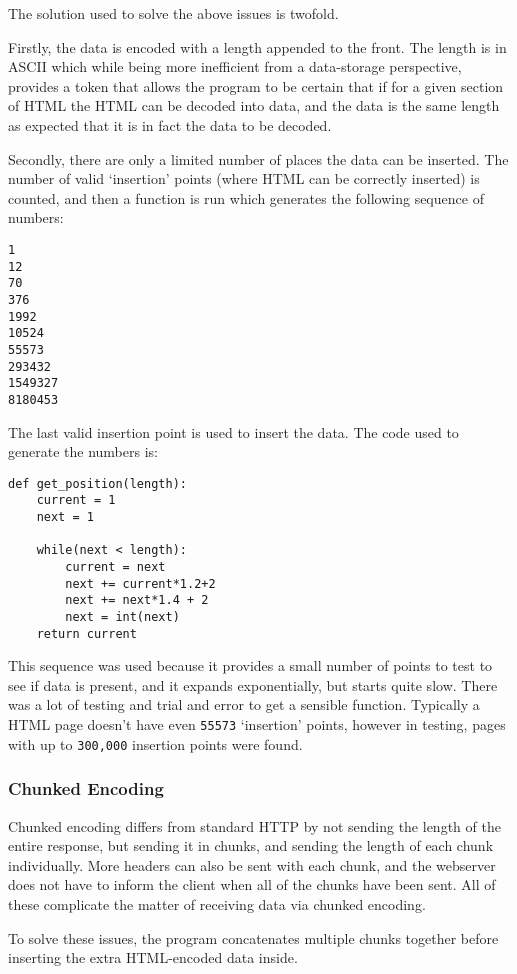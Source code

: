 The solution used to solve the above issues is twofold.\par
Firstly, the data is encoded with a length appended to the front.
The length is in ASCII which while being more inefficient from a data-storage perspective, provides a token that allows the program to be certain that if for a given section of HTML the HTML can be decoded into data, and the data is the same length as expected that it is in fact the data to be decoded.\par
Secondly, there are only a limited number of places the data can be inserted. The number of valid `insertion' points (where HTML can be correctly inserted) is counted, and then a function is run which generates the following sequence of numbers:
\begin{lstlisting}
1
12
70
376
1992
10524
55573
293432
1549327
8180453
\end{lstlisting}
The last valid insertion point is used to insert the data.
The code used to generate the numbers is:
\begin{lstlisting}
def get_position(length):
    current = 1
    next = 1

    while(next < length):
        current = next
        next += current*1.2+2
        next += next*1.4 + 2
        next = int(next)
    return current
\end{lstlisting}
This sequence was used because it provides a small number of points to test to see if data is present, and it expands exponentially, but starts quite slow. There was a lot of testing and trial and error to get a sensible function.
Typically a HTML page doesn't have even \texttt{55573} `insertion' points, however in testing, pages with up to \texttt{300,000} insertion points were found.

\subsubsection{Chunked Encoding}
Chunked encoding differs from standard HTTP by not sending the length of the entire response, but sending it in chunks, and sending the length of each chunk individually.
More headers can also be sent with each chunk, and the webserver does not have to inform the client when all of the chunks have been sent. All of these complicate the matter of receiving data via chunked encoding.\par
To solve these issues, the program concatenates multiple chunks together before inserting the extra HTML-encoded data inside.

